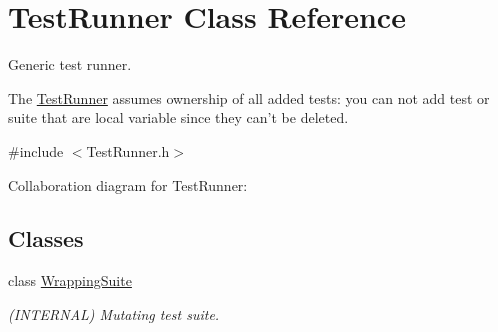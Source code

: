 \hypertarget{class_test_runner}{\section{Test\+Runner Class Reference}
\label{class_test_runner}
}


Generic test runner.

The \hyperlink{class_test_runner}{Test\+Runner} assumes ownership of all added tests\+: you can not add test or suite that are local variable since they can't be deleted.  




{\ttfamily \#include $<$Test\+Runner.\+h$>$}



Collaboration diagram for Test\+Runner\+:
\subsection*{Classes}
\begin{DoxyCompactItemize}
\item 
class \hyperlink{class_test_runner_1_1_wrapping_suite}{Wrapping\+Suite}
\begin{DoxyCompactList}\small\item\em (I\+N\+T\+E\+R\+N\+A\+L) Mutating test suite. \end{DoxyCompactList}\end{DoxyCompactItemize}
